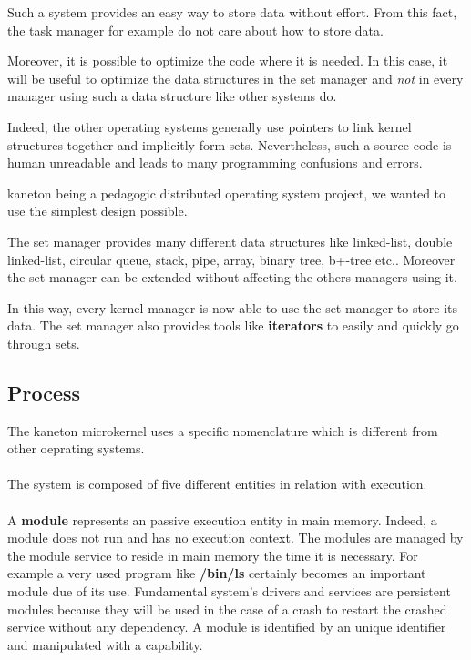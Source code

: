 \documentclass[10pt,a4wide]{article}
\begin{document}
\begin{multicols}{2}
Such a system provides an easy way to store data without effort. From this
fact, the task manager for example do not care about how to store data.

Moreover, it is possible to optimize the code where it is needed. In this
case, it will be useful to optimize the data structures in the set manager
and \textit{not} in every manager using such a data structure like
other systems do.

Indeed, the other operating systems generally use pointers to link kernel
structures together and implicitly form sets. Nevertheless, such a source code
is human unreadable and leads to many programming confusions and errors.

kaneton being a pedagogic distributed operating system project, we wanted
to use the simplest design possible.

The set manager provides many different data structures like linked-list,
double linked-list, circular queue, stack, pipe, array, binary tree, b+-tree
etc.. Moreover the set manager can be extended without affecting the others
managers using it.

In this way, every kernel manager is now able to use the set manager to
store its data. The set manager also provides tools like \textbf{iterators}
to easily and quickly go through sets.

\subsection{Process}

The kaneton microkernel uses a specific nomenclature which is different
from other oeprating systems.

\paragraph{}

The system is composed of five different entities in relation with execution.

\paragraph{}

A \textbf{module} represents an passive execution entity in main memory.
Indeed, a module does not run and has no execution context. The modules are
managed by the module service to reside in main memory the time it is
necessary. For example a very used program like \textbf{/bin/ls} certainly
becomes an important module due of its use. Fundamental system's drivers
and services are persistent modules because they will be used in the case
of a crash to restart the crashed service without any dependency.
A module is identified by an unique identifier and manipulated with a
capability.


\end{multicols}
\end{document}
